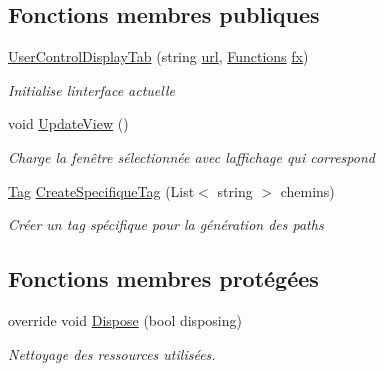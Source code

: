 \subsection*{Fonctions membres publiques}
\begin{DoxyCompactItemize}
\item 
\mbox{\hyperlink{class_m_t_connect_agent_1_1_user_control_display_tab_a75f993d745781ea932a201f00bbe150e}{User\+Control\+Display\+Tab}} (string \mbox{\hyperlink{class_m_t_connect_agent_1_1_user_control_display_tab_aadac9f472866bf956cae2bd897200e1a}{url}}, \mbox{\hyperlink{class_m_t_connect_agent_1_1_user_control_display_tab_a39c6241e9b8ef40634f8340676d557ec}{Functions}} \mbox{\hyperlink{class_m_t_connect_agent_1_1_user_control_display_tab_addffe628fc1709f3f186bdaa1946e558}{fx}})
\begin{DoxyCompactList}\small\item\em Initialise l\textquotesingle{}interface actuelle \end{DoxyCompactList}\item 
void \mbox{\hyperlink{class_m_t_connect_agent_1_1_user_control_display_tab_abcf66374bf792fe271d968bb035d749d}{Update\+View}} ()
\begin{DoxyCompactList}\small\item\em Charge la fenêtre sélectionnée avec l\textquotesingle{}affichage qui correspond \end{DoxyCompactList}\item 
\mbox{\hyperlink{class_m_t_connect_agent_1_1_model_1_1_tag}{Tag}} \mbox{\hyperlink{class_m_t_connect_agent_1_1_user_control_display_tab_a97ab71f68df06c33f0420131314c8a68}{Create\+Specifique\+Tag}} (List$<$ string $>$ chemins)
\begin{DoxyCompactList}\small\item\em Créer un tag spécifique pour la génération des paths \end{DoxyCompactList}\end{DoxyCompactItemize}
\subsection*{Fonctions membres protégées}
\begin{DoxyCompactItemize}
\item 
override void \mbox{\hyperlink{class_m_t_connect_agent_1_1_user_control_display_tab_a0cfe1921bf9282de4c87b7b3c68bf6e6}{Dispose}} (bool disposing)
\begin{DoxyCompactList}\small\item\em Nettoyage des ressources utilisées. \end{DoxyCompactList}\end{DoxyCompactItemize}

